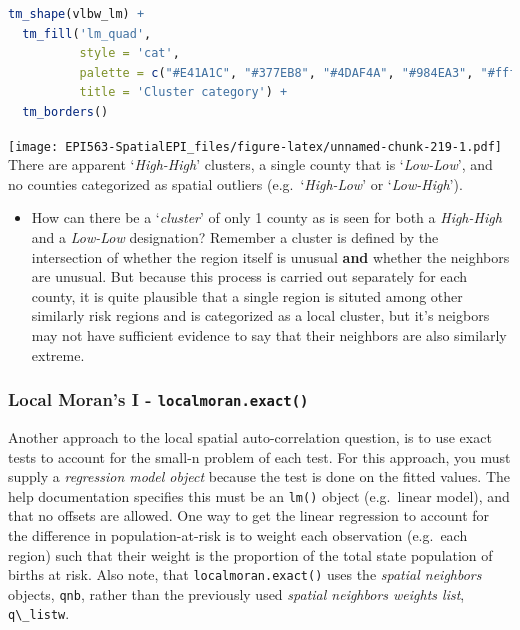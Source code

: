 \documentclass[
]{book}
\newcommand{\passthrough}[1]{#1}
\newenvironment{rmdblock}[1]
  {%
  \begin{itemize}
  \renewcommand{\labelitemi}{
    \raisebox{-.7\height}[0pt][0pt]{
      {\setkeys{Gin}{width=3em,keepaspectratio}\texttt{[image: images/\#1]}}
    }
  }
  \item
  }
  {
  \end{itemize}
  }
\newenvironment{rmdnote}
  {\begin{rmdblock}{note}}
  {\end{rmdblock}}
\begin{document}
\begin{lstlisting}[language=R]
tm_shape(vlbw_lm) +
  tm_fill('lm_quad',
          style = 'cat',
          palette = c("#E41A1C", "#377EB8", "#4DAF4A", "#984EA3", "#ffffb3"),
          title = 'Cluster category') +
  tm_borders()
\end{lstlisting}

\texttt{[image: EPI563-SpatialEPI\_files/figure-latex/unnamed-chunk-219-1.pdf]}
There are apparent `\emph{High-High}' clusters, a single county that is `\emph{Low-Low}', and no counties categorized as spatial outliers (e.g.~`\emph{High-Low}' or `\emph{Low-High}').

\begin{rmdnote}
How can there be a `\emph{cluster}' of only 1 county as is seen for both a \emph{High-High} and a \emph{Low-Low} designation? Remember a cluster is defined by the intersection of whether the region itself is unusual \textbf{and} whether the neighbors are unusual. But because this process is carried out separately for each county, it is quite plausible that a single region is situted among other similarly risk regions and is categorized as a local cluster, but it's neigbors may not have sufficient evidence to say that their neighbors are also similarly extreme.
\end{rmdnote}

\hypertarget{local-morans-i---localmoran.exact}{%
\subsubsection{\texorpdfstring{Local Moran's I - \texttt{localmoran.exact()}}{Local Moran's I - localmoran.exact()}}\label{local-morans-i---localmoran.exact}}

Another approach to the local spatial auto-correlation question, is to use exact tests to account for the small-n problem of each test. For this approach, you must supply a \emph{regression model object} because the test is done on the fitted values. The help documentation specifies this must be an \passthrough{\lstinline!lm()!} object (e.g.~linear model), and that no offsets are allowed. One way to get the linear regression to account for the difference in population-at-risk is to weight each observation (e.g.~each region) such that their weight is the proportion of the total state population of births at risk. Also note, that \passthrough{\lstinline!localmoran.exact()!} uses the \emph{spatial neighbors} objects, \passthrough{\lstinline!qnb!}, rather than the previously used \emph{spatial neighbors weights list}, \passthrough{\lstinline!q\_listw!}.
\end{document}
